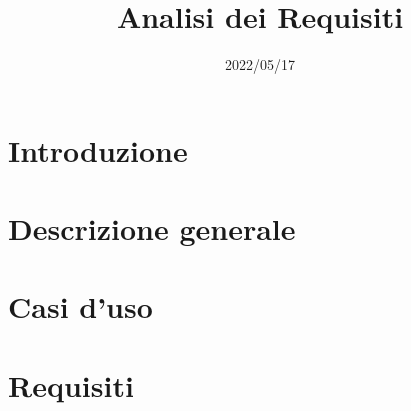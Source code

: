 \documentclass{classes/base}
\title{Analisi dei Requisiti}
\date{2022/05/17}
\author{\giulio}
\begin{document}
	\maketitle
	\newpage
	
	\newpage
	\tableofcontents
	\newpage
	\listoftables
	\newpage
	\listoffigures
	\newpage

	\newpage
	\section{Introduzione}
	

	\newpage
	\section{Descrizione generale}
	

	\newpage
	\section{Casi d'uso}
	

	\newpage
	\section{Requisiti}
	
\end{document}

